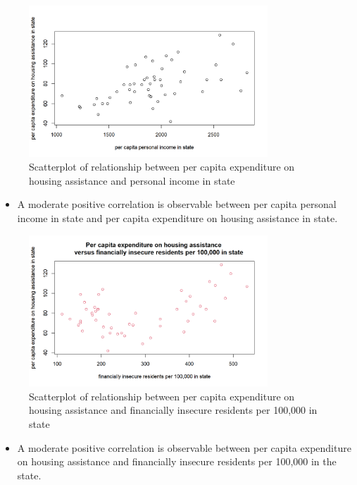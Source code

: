 \documentclass[12pt,letterpaper]{article}
\begin{document}
\newpage

\begin{figure}[H]
	\caption{Scatterplot of relationship between per capita expenditure on housing assistance and personal income in state}
	\centering
	\includegraphics[width=0.8\textwidth]{Figure_1_1.png}
\end{figure}

\begin{itemize}
	\item 
A moderate positive correlation is observable between per capita personal income in state and per capita expenditure on housing assistance in state.
\end{itemize}

\newpage

\begin{figure}[H]
	\caption{Scatterplot of relationship between per capita expenditure on housing assistance and financially insecure residents per 100,000 in state}
	\centering
	\includegraphics[width=0.8\textwidth]{Figure_1_2.png}
\end{figure}

\begin{itemize}
	\item 
A moderate positive correlation is observable between per capita expenditure on housing assistance and financially insecure residents per 100,000 in the state.
\end{itemize}
\end{document}
